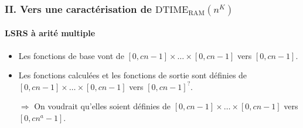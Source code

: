 \documentclass[10pt]{beamer}
\newcommand{\dtimeram}{\text{DTIME}_{\text{RAM}}\left( n^K \right)}
\begin{document}
\begin{frame}
		
		
	\end{frame}
	
	
	
	
	\begin{frame}
		\frametitle{II. Vers une caractérisation de $\dtimeram$}
		\framesubtitle{LSRS à arité multiple}
		
		
		\begin{itemize}
			\item 	Les fonctions de base vont de $[0, c n-1] \times \dots \times [0, c n-1]$ vers $[0, c n-1]$. %
			\item 	Les fonctions calculées et les fonctions de sortie sont définies de $[0, c n-1] \times \dots \times [0, c n-1]$ vers $[0, c n-1]^{?}$.
			\pause 
			\item[$\Rightarrow$] On voudrait qu'elles soient définies de $[0, c n-1] \times \dots \times [0, c n-1]$ vers $[0, c n^a-1]$.
		\end{itemize}
	\end{frame}
	
	
\end{document}
